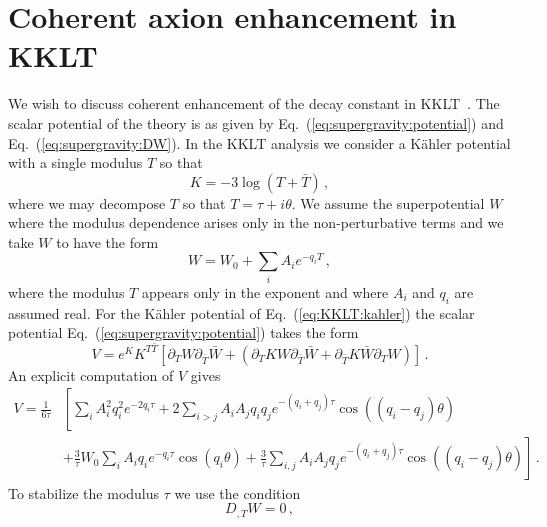 \documentclass[12pt]{article}
\begin{document}
\section{Coherent axion enhancement in KKLT \label{sec:KKLT}}
We wish to discuss coherent enhancement of the decay constant in KKLT~\cite{Kachru:2003aw}.
The scalar potential of the theory is as given by Eq.~(\ref{eq:supergravity:potential}) and Eq.~(\ref{eq:supergravity:DW}).
In the KKLT analysis we consider a K\"ahler potential with a single modulus $T$ so that
\begin{equation} \label{eq:KKLT:kahler}
  K = -3 \log\left(T + \bar T\right)\,,
\end{equation}
where we may decompose $T$ so that $T = \tau + i \theta$.
We assume the superpotential $W$ where the modulus dependence arises only in the non-perturbative terms and we take $W$ to have the form
\begin{equation} \label{eq:KKLT:W}
  W = W_0 + \sum_i A_i e^{-q_i T}\,,
\end{equation}
where the modulus $T$ appears only in the exponent and where $A_i$ and $q_i$ are assumed real.
For the K\"ahler potential of Eq.~(\ref{eq:KKLT:kahler}) the scalar potential Eq.~(\ref{eq:supergravity:potential}) takes the form
\begin{equation}
  V = e^K K^{T \bar T} \left[
    \partial_T W \partial_{\bar T} \bar W +
    \left(\partial_T K W \partial_{\bar T} \bar W + \partial_{\bar T} K \bar W \partial_T W\right)
  \right]\,.
\end{equation}
An explicit computation of $V$ gives
\begin{equation} \label{eq:KKLT:VslowUnstabilized}
  \begin{aligned}
    V = \frac{1}{6 \tau} &\left[
        \sum_i A^2_i q^2_i e^{-2 q_i \tau}
      + 2 \sum_{i > j} A_i A_j q_i q_j e^{-\left(q_i + q_j\right)\tau}
        \cos\left(\left(q_i - q_j\right) \theta\right)\right.\\
    &{}\left. + \frac{3}{\tau} W_0 \sum_i A_i q_i e^{-q_i \tau} \cos\left(q_i \theta\right)
      + \frac{3}{\tau} \sum_{i, j} A_i A_j q_j e^{-\left(q_i + q_j\right) \tau}
        \cos\left(\left(q_i - q_j\right)\theta\right)
    \right]\,.
  \end{aligned}
\end{equation}
To stabilize the modulus $\tau$ we use the condition~\cite{Nath:1983aw}
\begin{equation} \label{eq:KKLT:stabilization}
  D_{,T} W = 0\,,
\end{equation}
\end{document}
